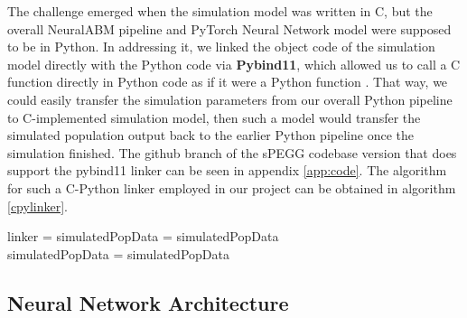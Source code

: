 \documentclass[12pt]{article}
\begin{document}
The challenge emerged when the simulation model was written in C, but the overall NeuralABM pipeline and PyTorch Neural Network model were supposed to be in Python. In addressing it, we linked the object code of the simulation model directly with the Python code via \textbf{Pybind11}, which allowed us to call a C function directly in Python code as if it were a Python function \cite{pybind11}. That way, we could easily transfer the simulation parameters from our overall Python pipeline to C-implemented simulation model, then such a model would transfer the simulated population output back to the earlier Python pipeline once the simulation finished. The github branch of the sPEGG codebase version that does support the pybind11 linker can be seen in appendix \ref{app:code}. The algorithm for such a C-Python linker employed in our project can be obtained in algorithm \ref{cpylinker}.

\begin{algorithm}[h]
\caption{sPEGG simulation model in C++ exposed to Python for convenience purposes.} \label{cpylinker}
\begin{algorithmic}[1]
        \State linker = 
        \State {}
        \State simulatedPopData = 
        \State \Return simulatedPopData
    \EndFunction
    \\
        \State simulatedPopData = 
        \State \Return simulatedPopData
    \EndFunction
\end{algorithmic}
\vspace{0.6em}
\end{algorithm}

\subsection{Neural Network Architecture}
\end{document}
